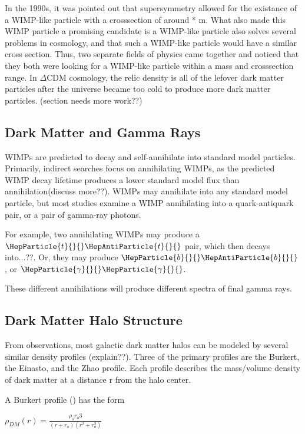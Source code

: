 
In the 1990s, it was pointed out that supersymmetry allowed for the existance of a WIMP-like particle with a crosssection of around  *  m.
What also made this WIMP particle a promising candidate is a WIMP-like particle also solves several problems in cosmology, and that such a WIMP-like particle would have a similar cross section.
Thus, two separate fields of physics came together and noticed that they both were looking for a WIMP-like particle within a mass and crosssection range.
In $\Delta$CDM cosmology, the relic density is all of the lefover dark matter particles after the universe became too cold to produce more dark matter particles.
(section needs more work??)

\subsection{Dark Matter and Gamma Rays}

WIMPs are predicted to decay and self-annihilate into standard model particles.
Primarily, indirect searches focus on annihilating WIMPs, as the predicted WIMP decay lifetime produces a lower standard model flux than annihilation(discuss more??).
WIMPs may annihilate into any standard model particle, but most studies examine a WIMP annihilating into a quark-antiquark pair, or a pair of gamma-ray photons.

For example, two annihilating WIMPs may produce a $\HepParticle{t}{}{}\HepAntiParticle{t}{}{}$ pair, which then decays into...??.
Or, they may produce $\HepParticle{b}{}{}\HepAntiParticle{b}{}{}$, or $\HepParticle{\gamma}{}{}\HepParticle{\gamma}{}{}$.

These different annihilations will produce different spectra of final gamma rays.

\subsection{Dark Matter Halo Structure}

From observations, most galactic dark matter halos can be modeled by several similar density profiles (explain??).
Three of the primary profiles are the Burkert, the Einasto, and the Zhao profile.
Each profile describes the mass/volume density of dark matter at a distance r from the halo center.

A Burkert profile (\cite{burkertprofile}) has the form

$ \rho_{DM} \left( r \right) = \frac{ \rho_o r_o3}{ \left( r + r_o \right) \left( r^2 + r_o^2 \right)} $ \label{eqn:burkert}

